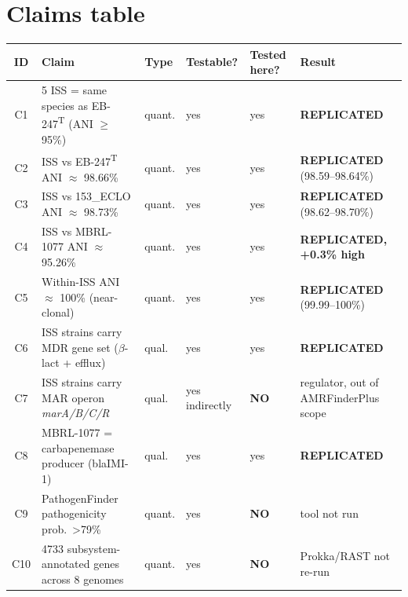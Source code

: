 \documentclass[11pt]{article}
\begin{document}
\section{Claims table}
\label{sec:claims}
\begin{longtable}{clllll}
\toprule
ID & Claim & Type & Testable? & Tested here? & Result \\
\midrule
C1 & 5 ISS = same species as EB-247\textsuperscript{T} (ANI $\geq$95\%) & quant. & yes & yes & \textbf{REPLICATED} \\
C2 & ISS vs EB-247\textsuperscript{T} ANI $\approx$ 98.66\% & quant. & yes & yes & \textbf{REPLICATED} (98.59--98.64\%) \\
C3 & ISS vs 153\_ECLO ANI $\approx$ 98.73\% & quant. & yes & yes & \textbf{REPLICATED} (98.62--98.70\%) \\
C4 & ISS vs MBRL-1077 ANI $\approx$ 95.26\% & quant. & yes & yes & \textbf{REPLICATED, +0.3\% high} \\
C5 & Within-ISS ANI $\approx$ 100\% (near-clonal) & quant. & yes & yes & \textbf{REPLICATED} (99.99--100\%) \\
C6 & ISS strains carry MDR gene set ($\beta$-lact + efflux) & qual. & yes & yes & \textbf{REPLICATED} \\
C7 & ISS strains carry MAR operon \emph{marA/B/C/R} & qual. & yes indirectly & \textbf{NO} & regulator, out of AMRFinderPlus scope \\
C8 & MBRL-1077 = carbapenemase producer (blaIMI-1) & qual. & yes & yes & \textbf{REPLICATED} \\
C9 & PathogenFinder pathogenicity prob.\ \textgreater 79\% & quant. & yes & \textbf{NO} & tool not run \\
C10 & 4733 subsystem-annotated genes across 8 genomes & quant. & yes & \textbf{NO} & Prokka/RAST not re-run \\
\bottomrule
\end{longtable}
\end{document}
